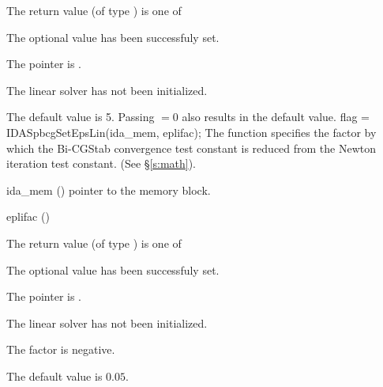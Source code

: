 {{\begin{args}
  \end{args}
}
{
  The return value  (of type ) is one of
  \begin{args}
  \item[\Id{IDASPBCG\_SUCCESS}] 
    The optional value has been successfuly set.
  \item[\Id{IDASPBCG\_MEM\_NULL}]
    The  pointer is .
  \item[\Id{IDASPBCG\_LMEM\_NULL}]
    The {\idaspbcg} linear solver has not been initialized.
  \end{args}
}
{
  The default value is 5.  Passing  $= 0$ also results in the
  default value. 
}
{
  flag = IDASpbcgSetEpsLin(ida\_mem, eplifac);
}
{
  The function  specifies the factor by
  which the Bi-CGStab convergence test constant is reduced
  from the Newton iteration test constant. (See \S\ref{s:math}).
}
{
  \begin{args}
  \item[ida\_mem] ()
    pointer to the {\ida} memory block.
  \item[eplifac] ()

  \end{args}
}
{
  The return value  (of type ) is one of
  \begin{args}
  \item[\Id{IDASPBCG\_SUCCESS}] 
    The optional value has been successfuly set.
  \item[\Id{IDASPBCG\_MEM\_NULL}]
    The  pointer is .
  \item[\Id{IDASPBCG\_LMEM\_NULL}]
    The {\idaspbcg} linear solver has not been initialized.
  \item[\Id{IDASPBCG\_ILL\_INPUT}]
    The factor  is negative.  
  \end{args}
}
{
  The default value is $0.05$.

}}
